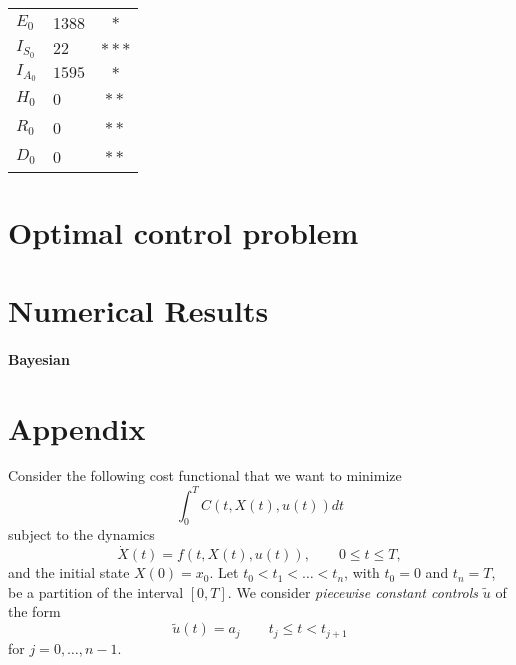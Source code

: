 \documentclass[a4paper,10pt]{amsart}
\begin{document}
\begin{table}
\begin{tabular}{@{}llc@{}}
                $E_0$
                 & \num{1388}
                 & $*$
            \\
                $I_{S_0}$
                & $\num{22}$
                & $***$
            \\
                $I_{A_0}$
                & $\num{1595}$
                & $*$
            \\
                $H_0$
                & \num{0}
                & $**$
            \\
                $R_0$
                & \num{0}
                & $**$
            \\
                $D_0$
                & \num{0}
                & $**$
            \\
            \bottomrule
        \end{tabular}
    \end{table}
    \section{Optimal control problem}
    
    \section{Numerical Results}
    
    \paragraph{Bayesian}
        
    
    \section{Appendix}

Consider the following cost functional that we want to minimize
  \begin{equation}\label{costFunctional}
  \int_0^T C(t,X(t),u(t)) dt
  \end{equation}
subject to the dynamics
  \begin{equation}\label{dynamics}
  \dot{X}(t) = f(t,X(t),u(t)),  \qquad    0\leq t \leq T,
  \end{equation}
and the initial state $X(0)=x_0$. Let $t_0<t_1<\ldots <t_n$, with $t_0=0$ and $t_n=T$, be a partition of the interval $[0,T]$. We consider {\it piecewise constant controls} $\tilde{u}$ of the form 
         \begin{equation}\label{PieceConstCont}
  \tilde{u}(t) = a_j\qquad t_j\leq t < t_{j+1}  
         \end{equation}
 for $j=0,\ldots,n-1$.	
\end{document}
